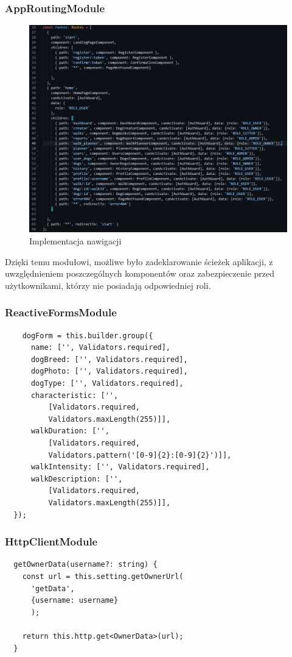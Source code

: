 \subsubsection{AppRoutingModule}
\begin{figure}[H]
  \centering
  \includegraphics[width=0.7\linewidth]{rysunki/routes.PNG}
  \caption{Implementacja nawigacji}
  \label{fig:walker-routes}
\end{figure}
Dzięki temu modułowi, możliwe było zadeklarowanie ścieżek aplikacji, z uwzględnieniem poszczególnych komponentów oraz zabezpieczenie przed użytkownikami, którzy nie posiadają odpowiedniej roli.

\subsubsection{ReactiveFormsModule}
\begin{lstlisting}
    dogForm = this.builder.group({
      name: ['', Validators.required],
      dogBreed: ['', Validators.required],
      dogPhoto: ['', Validators.required],
      dogType: ['', Validators.required],
      characteristic: ['', 
          [Validators.required, 
          Validators.maxLength(255)]],
      walkDuration: ['', 
          [Validators.required, 
          Validators.pattern('[0-9]{2}:[0-9]{2}')]],
      walkIntensity: ['', Validators.required],
      walkDescription: ['', 
          [Validators.required, 
          Validators.maxLength(255)]],
  });
\end{lstlisting}

\subsubsection{HttpClientModule}
\begin{lstlisting}
  getOwnerData(username?: string) {
    const url = this.setting.getOwnerUrl(
      'getData', 
      {username: username}
      );

    return this.http.get<OwnerData>(url);
  }
\end{lstlisting}

